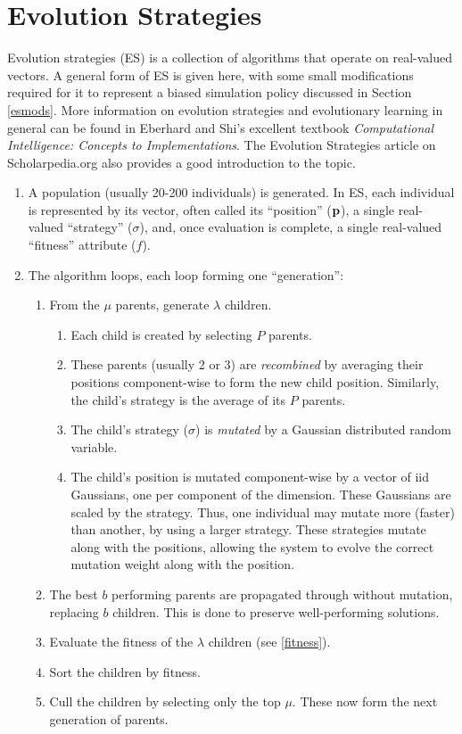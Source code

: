\documentclass[10pt,a4paper]{report}
\begin{document}
\section{Evolution Strategies}
Evolution strategies (ES) is a collection of algorithms that operate on real-valued vectors. A general form of ES is given here, with some small modifications required for it to represent a biased simulation policy discussed in Section \ref{esmods}. More information on evolution strategies and evolutionary learning in general can be found in Eberhard and Shi's excellent textbook \emph{Computational Intelligence: Concepts to Implementations}\cite{eberhart2007computational}. The Evolution Strategies article on Scholarpedia.org also provides a good introduction to the topic\cite{Beyer:2007}.

\begin{enumerate}
\item A population (usually 20-200 individuals) is generated. In ES, each individual is represented by its vector, often called its ``position'' ($\bf{p}$), a single real-valued ``strategy'' ($\sigma$), and, once evaluation is complete, a single real-valued ``fitness'' attribute ($f$).
\item The algorithm loops, each loop forming one ``generation'':
	\begin{enumerate}
	\item From the $\mu$ parents, generate $\lambda$ children.
		\begin{enumerate}
		\item Each child is created by selecting $P$ parents.
		\item These parents (usually 2 or 3) are \emph{recombined} by averaging their positions component-wise to form the new child position. Similarly, the child's strategy is the average of its $P$ parents.
		\item	The child's strategy ($\sigma$) is \emph{mutated} by a Gaussian distributed random variable.
		\item The child's position is mutated component-wise by a vector of iid Gaussians, one per component of the dimension. These Gaussians are scaled by the strategy. Thus, one individual may mutate more (faster) than another, by using a larger strategy. These strategies mutate along with the positions, allowing the system to evolve the correct mutation weight along with the position.
		\end{enumerate}
	\item The best $b$ performing parents are propagated through without mutation, replacing $b$ children. This is done to preserve well-performing solutions.
	\item Evaluate the fitness of the $\lambda$ children (see \ref{fitness}).
	\item Sort the children by fitness.
	\item Cull the children by selecting only the top $\mu$. These now form the next generation of parents.
	\end{enumerate}
\end{enumerate}
\end{document}
